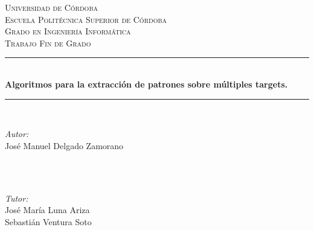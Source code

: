 \documentclass[a4paper, 12pt]{book}
\begin{document}


\begin{titlepage}

\newcommand{\HRule}{\rule{\linewidth}{0.5mm}}

\center 
 

\textsc{\LARGE Universidad de Córdoba}\\[1.5cm] %
\textsc{\Large Escuela Politécnica Superior de Córdoba}\\[0.5cm] %
\textsc{\Large Grado en Ingeniería Informática}\\[0.5cm] %
\textsc{\large Trabajo Fin de Grado}\\[0.5cm] %


\HRule \\[0.4cm]
{ \LARGE \bfseries Algoritmos para la extracción de patrones sobre múltiples targets.}\\[0.4cm] %
\HRule \\[1.5cm]
 

\begin{minipage}{0.5\textwidth}
\begin{center}
\emph{Autor:}\\
José Manuel Delgado Zamorano %
\end{center}
\end{minipage}\\[1cm]
~
\begin{minipage}{0.5\textwidth}
\begin{center}
\emph{Tutor:}\\
José María Luna Ariza \\
Sebastián Ventura Soto
\vspace*{0.15in}


\end{center}
\end{minipage}
\end{titlepage}
\end{document}
